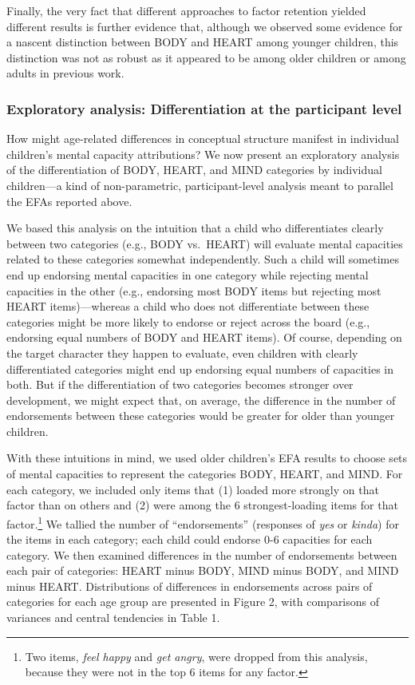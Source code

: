 \documentclass[10pt, letterpaper]{article}
\begin{document}
Finally, the very fact that different approaches to factor retention
yielded different results is further evidence that, although we observed
some evidence for a nascent distinction between BODY and HEART among
younger children, this distinction was not as robust as it appeared to
be among older children or among adults in previous work.

\subsubsection{Exploratory analysis: Differentiation at the participant
level}\label{exploratory-analysis-differentiation-at-the-participant-level}

How might age-related differences in conceptual structure manifest in
individual children's mental capacity attributions? We now present an
exploratory analysis of the differentiation of BODY, HEART, and MIND
categories by individual children---a kind of non-parametric,
participant-level analysis meant to parallel the EFAs reported above.

We based this analysis on the intuition that a child who differentiates
clearly between two categories (e.g., BODY vs.~HEART) will evaluate
mental capacities related to these categories somewhat independently.
Such a child will sometimes end up endorsing mental capacities in one
category while rejecting mental capacities in the other (e.g., endorsing
most BODY items but rejecting most HEART items)---whereas a child who
does not differentiate between these categories might be more likely to
endorse or reject across the board (e.g., endorsing equal numbers of
BODY and HEART items). Of course, depending on the target character they
happen to evaluate, even children with clearly differentiated categories
might end up endorsing equal numbers of capacities in both. But if the
differentiation of two categories becomes stronger over development, we
might expect that, on average, the difference in the number of
endorsements between these categories would be greater for older than
younger children.

With these intuitions in mind, we used older children's EFA results to
choose sets of mental capacities to represent the categories BODY,
HEART, and MIND. For each category, we included only items that (1)
loaded more strongly on that factor than on others and (2) were among
the 6 strongest-loading items for that
factor.\footnote{Two items, \textit{feel happy} and \textit{get angry}, were dropped from this analysis, because they were not in the top 6 items for any factor.}
We tallied the number of ``endorsements'' (responses of \emph{yes} or
\emph{kinda}) for the items in each category; each child could endorse
0-6 capacities for each category. We then examined differences in the
number of endorsements between each pair of categories: HEART minus
BODY, MIND minus BODY, and MIND minus HEART. Distributions of
differences in endorsements across pairs of categories for each age
group are presented in Figure 2, with comparisons of variances and
central tendencies in Table 1.
\end{document}
